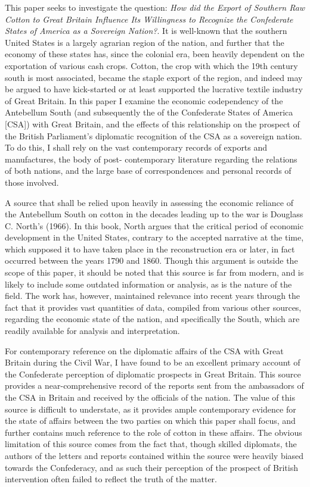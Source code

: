 
This paper seeks to investigate the question: \flq{}\textit{How did the Export of Southern Raw Cotton to Great Britain Influence Its Willingness to Recognize the
Confederate States of America as a Sovereign Nation?}\frq{}. It is well-known that the southern United States is a largely agrarian region of the nation, and further that 
the economy of these states has, since the colonial era, been heavily dependent on the exportation of various \flq{}cash crops\frq{}. Cotton, the crop with which 
the 19th century south is most associated, became the staple export of the region, and indeed may be argued to have kick-started or at least supported the 
lucrative textile industry of Great Britain. In this paper I examine the economic codependency of the Antebellum South (and subsequently the of the 
Confederate States of America [CSA]) with Great Britain, and the effects of this relationship on the prospect of the British Parliament's diplomatic 
recognition of the CSA as a sovereign nation. To do this, I shall rely on the vast contemporary records of exports and manufactures, the body of post-
contemporary literature regarding the relations of both nations, and the large base of correspondences and personal records of those involved.

A source that shall be relied upon heavily in assessing the economic reliance of the Antebellum South on cotton in the decades leading up to the war is 
Douglass C. North's  (1966). In this book, North argues that the critical period of economic development in the United States, 
contrary to the accepted narrative at the time, which supposed it to have taken place in the reconstruction era or later, in fact occurred between the
years 1790 and 1860. Though this argument is outside the scope of this paper, it should be noted that this source is far from modern, and is likely
to include some outdated information or analysis, as is the nature of the field. The work has, however, maintained relevance into recent years
through the fact that it provides vast quantities of data, compiled from various other sources, regarding the economic state of the nation, and specifically
the South, which are readily available for analysis and interpretation.

For contemporary reference on the diplomatic affairs of the CSA with Great Britain during the Civil War, I have found 
to be an excellent primary account of the Confederate perception of diplomatic prospects in Great Britain. This source provides a near-comprehensive 
record of the reports sent from the ambassadors of the CSA in Britain and received by the officials of the nation. The value of this source is difficult
to understate, as it provides ample contemporary evidence for the state of affairs between the two parties on which this paper shall focus, and further
contains much reference to the role of cotton in these affairs. The obvious limitation of this source comes from the fact that, though skilled diplomats,
the authors of the letters and reports contained within the source were heavily biased towards the Confederacy, and as such their perception of the 
prospect of British intervention often failed to reflect the truth of the matter. 